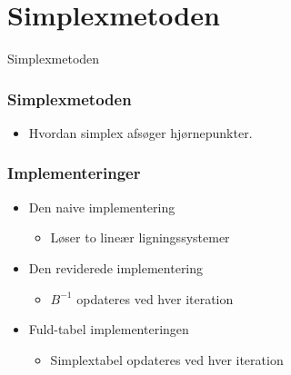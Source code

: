 \section{Simplexmetoden}
\begin{frame}
\centering
\Huge
Simplexmetoden
\end{frame}
%
\begin{frame}
\frametitle{Simplexmetoden}
\begin{itemize}
\item Hvordan simplex afsøger hjørnepunkter.
\end{itemize}
\end{frame}
%
%
%
\begin{frame}
\frametitle{Implementeringer}
\begin{itemize}
\item Den naive implementering 
	\begin{itemize}
	\item Løser to lineær ligningssystemer
	\end{itemize}
\item Den reviderede implementering 
	\begin{itemize}
	\item $B^{-1}$ opdateres ved hver iteration
	\end{itemize}
\item Fuld-tabel implementeringen
	\begin{itemize}
	\item Simplextabel opdateres ved hver iteration
	\end{itemize} 
\end{itemize}
\end{frame}

